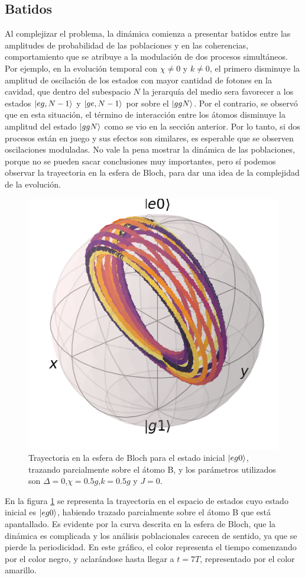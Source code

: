 \subsection{Batidos}

Al complejizar el problema, la dinámica comienza a presentar batidos entre las amplitudes de probabilidad de las poblaciones y en las coherencias, comportamiento que se atribuye a la modulación de dos procesos simultáneos. Por ejemplo, en la evolución temporal con $\chi\neq0$ y $k\neq0$, el primero disminuye la amplitud de oscilación de los estados con mayor cantidad de fotones en la cavidad, que dentro del subespacio $N$ la jerarquía del medio sera favorecer a los estados $\ket{eg,N-1}$ y $\ket{ge,N-1}$ por sobre el $\ket{ggN}$. Por el contrario, se observó que en esta situación, el término de interacción entre los átomos disminuye la amplitud del estado $\ket{ggN}$ como se vio en la sección anterior. Por lo tanto, si dos procesos están en juego y sus efectos son similares, es esperable que se observen oscilaciones moduladas. No vale la pena mostrar la dinámica de las poblaciones, porque no se pueden sacar conclusiones muy importantes, pero sí podemos observar la trayectoria en la esfera de Bloch, para dar una idea de la complejidad de la evolución.
\begin{figure}[h]
    \centering
    \includegraphics[width=0.5\linewidth]{figuras/ch4/eg0 bloch AC a=0 d=0.0 x=0.5 k=0.5 J=0.0 gamma=0.0 p=0.0.png}
    \caption{Trayectoria en la esfera de Bloch para el estado inicial $\ket{eg0}$, trazando parcialmente sobre el átomo B, y los parámetros utilizados son $\Delta=0$,$\chi=0.5g$,$k=0.5g$ y $J=0$.}
    \label{fig4:eg0 bloch batidos}
\end{figure}
En la figura \ref{fig4:eg0 bloch batidos} se representa la trayectoria en el espacio de estados cuyo estado inicial es $\ket{eg0}$, habiendo trazado parcialmente sobre el átomo B que está apantallado. Es evidente por la curva descrita en la esfera de Bloch, que la dinámica es complicada y los análisis poblacionales carecen de sentido, ya que se pierde la periodicidad. En este gráfico, el color representa el tiempo comenzando por el color negro, y aclarándose hasta llegar a $t=7T$, representado por el color amarillo. 
